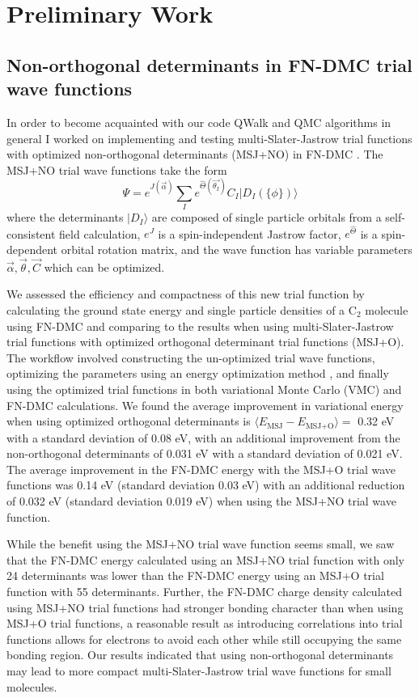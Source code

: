 \documentclass[12pt]{article}
\begin{document}
\section{Preliminary Work}
\subsection{Non-orthogonal determinants in FN-DMC trial wave functions}
In order to become acquainted with our code QWalk \cite{WAGNER20093390} and QMC algorithms in general I worked on implementing and testing multi-Slater-Jastrow trial functions with optimized non-orthogonal determinants (MSJ+NO) in FN-DMC \cite{Pathak2018}.
The MSJ+NO trial wave functions take the form
\begin{equation}
\Psi=e^{J(\vec{\alpha})} \sum_I e^{\hat{\Theta}(\vec{\theta_I})} C_I |D_I (\{ \phi\})\rangle
\end{equation}
where the determinants $|D_I\rangle$ are composed of single particle orbitals from a self-consistent field calculation, $e^J$ is a spin-independent Jastrow factor, $e^{\hat{\Theta}}$ is a spin-dependent orbital rotation matrix, and the wave function has variable parameters $\vec{\alpha}, \vec{\theta}, \vec{C}$ which can be optimized.

We assessed the efficiency and compactness of this new trial function by calculating the ground state energy and single particle densities of a C$_2$ molecule using FN-DMC and comparing to the results when using multi-Slater-Jastrow trial functions with optimized orthogonal determinant trial functions (MSJ+O). 
The workflow involved constructing the un-optimized trial wave functions, optimizing the parameters using an energy optimization method \cite{Toulouse2007}, and finally using the optimized trial functions in both variational Monte Carlo (VMC) and FN-DMC calculations. 
We found the average improvement in variational energy when using optimized orthogonal determinants is $\langle E_\text{MSJ} - E_\text{MSJ+O} \rangle = $ 0.32 eV with a standard deviation of 0.08 eV, with an additional improvement from the non-orthogonal determinants of 0.031 eV with a standard deviation of 0.021 eV.
The average improvement in the FN-DMC energy with the MSJ+O trial wave functions was 0.14 eV (standard deviation 0.03 eV) with an additional reduction of 0.032 eV (standard deviation 0.019 eV) when using the MSJ+NO trial wave function.

While the benefit using the MSJ+NO trial wave function seems small, we saw that the FN-DMC energy calculated using an MSJ+NO trial function with only 24 determinants was lower than the FN-DMC energy using an MSJ+O trial function with 55 determinants.
Further, the FN-DMC charge density calculated using MSJ+NO trial functions had stronger bonding character than when using MSJ+O trial functions, a reasonable result as introducing correlations into trial functions allows for electrons to avoid each other while still occupying the same bonding region. 
Our results indicated that using non-orthogonal determinants may lead to more compact multi-Slater-Jastrow trial wave functions for small molecules.
\end{document}
